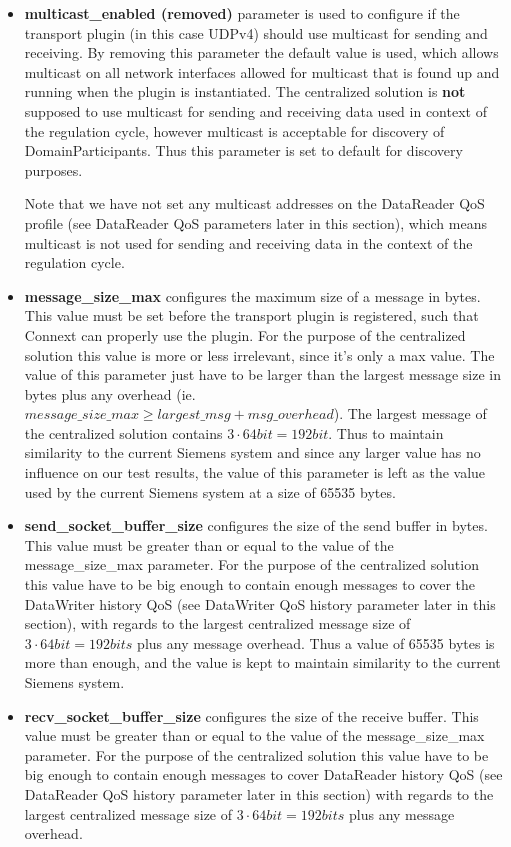 \begin{itemize}
	\item \textbf{multicast\_enabled (removed)} parameter is used to configure if the transport plugin (in this case UDPv4) should use multicast for sending and receiving. By removing this parameter the default value is used, which allows multicast on all network interfaces allowed for multicast that is found up and running when the plugin is instantiated. The centralized solution is \textbf{not} supposed to use multicast for sending and receiving data used in context of the regulation cycle, however multicast is acceptable for discovery of DomainParticipants. Thus this parameter is set to default for discovery purposes.
	
	Note that we have not set any multicast addresses on the DataReader QoS profile (see DataReader QoS parameters later in this section), which means multicast is not used for sending and receiving data in the context of the regulation cycle.
	
	\item \textbf{message\_size\_max} configures the maximum size of a message in bytes. This value must be set before the transport plugin is registered, such that Connext can properly use the plugin. For the purpose of the centralized solution this value is more or less irrelevant, since it's only a max value. The value of this parameter just have to be larger than the largest message size in bytes plus any overhead (ie. $message\_size\_max \geq largest\_msg + msg\_overhead$). The largest message of the centralized solution contains $3\cdot64bit=192bit$. Thus to maintain similarity to the current Siemens system and since any larger value has no influence on our test results, the value of this parameter is left as the value used by the current Siemens system at a size of 65535 bytes.
	
	\item \textbf{send\_socket\_buffer\_size} configures the size of the send buffer in bytes. This value must be greater than or equal to the value of the message\_size\_max parameter. For the purpose of the centralized solution this value have to be big enough to contain enough messages to cover the DataWriter history QoS (see DataWriter QoS history parameter later in this section), with regards to the largest centralized message size of $3\cdot64bit=192bits$ plus any message overhead. Thus a value of 65535 bytes is more than enough, and the value is kept to maintain similarity to the current Siemens system.
	
	\item \textbf{recv\_socket\_buffer\_size} configures the size of the receive buffer. This value must be greater than or equal to the value of the message\_size\_max parameter. For the purpose of the centralized solution this value have to be big enough to contain enough messages to cover DataReader history QoS (see DataReader QoS history parameter later in this section) with regards to the largest centralized message size of $3\cdot64bit=192bits$ plus any message overhead. 
\end{itemize}

